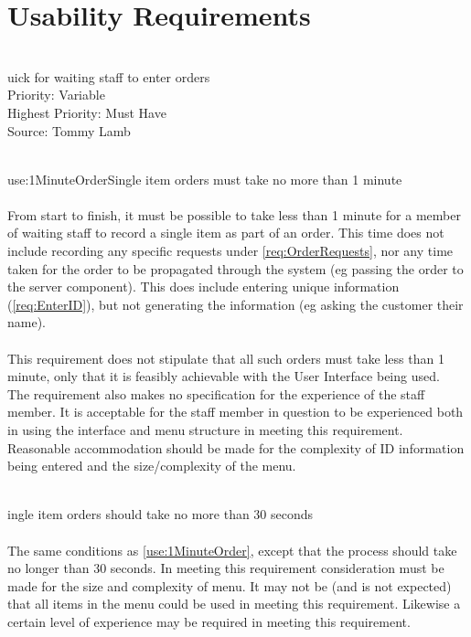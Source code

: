 \documentclass[11pt, a4paper]{report}
\def\itempar#1\\{\item \textbf{#1}\\} %
\begin{document}



\section{Usability Requirements} \label{sec:Usability}

\begin{enumerate}[label=NF-UR-\arabic*, series=nonfunctional]

\itempar Quick for waiting staff to enter orders\\
Priority: Variable\\
Highest Priority: Must Have\\
Source: Tommy Lamb\\
\begin{enumerate}[label*=.\arabic*]

\itempar \label{use:1MinuteOrder}Single item orders must take no more than 1 minute\\
\underline{}\\
From start to finish, it must be possible to take less than 1 minute for a member of waiting staff to record a single item as part of an order. This time does not include recording any specific requests under \autoref{req:OrderRequests}, nor any time taken for the order to be propagated through the system (eg passing the order to the server component). This does include entering unique information (\autoref{req:EnterID}), but not generating the information (eg asking the customer their name).\\
\\
This requirement does not stipulate that all such orders must take less than 1 minute, only that it is feasibly achievable with the User Interface being used.\\
The requirement also makes no specification for the experience of the staff member. It is acceptable for the staff member in question to be experienced both in using the interface and menu structure in meeting this requirement.\\
Reasonable accommodation should be made for the complexity of ID information being entered and the size/complexity of the menu.


\itempar Single item orders should take no more than 30 seconds\\
\underline{}\\
The same conditions as \autoref{use:1MinuteOrder}, except that the process should take no longer than 30 seconds. In meeting this requirement consideration must be made for the size and complexity of menu. It may not be (and is not expected) that all items in the menu could be used in meeting this requirement. Likewise a certain level of experience may be required in meeting this requirement.


\end{enumerate}
\end{enumerate}
\end{document}

